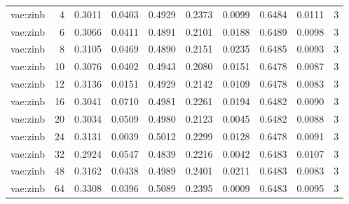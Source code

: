 \begin{tabular}{lrrrrrrrrr}
vae:zinb & 4 & 0.3011 & 0.0403 & 0.4929 & 0.2373 & 0.0099 & 0.6484 & 0.0111 & 3 \\
vae:zinb & 6 & 0.3066 & 0.0411 & 0.4891 & 0.2101 & 0.0188 & 0.6489 & 0.0098 & 3 \\
vae:zinb & 8 & 0.3105 & 0.0469 & 0.4890 & 0.2151 & 0.0235 & 0.6485 & 0.0093 & 3 \\
vae:zinb & 10 & 0.3076 & 0.0402 & 0.4943 & 0.2080 & 0.0151 & 0.6478 & 0.0087 & 3 \\
vae:zinb & 12 & 0.3136 & 0.0151 & 0.4929 & 0.2142 & 0.0109 & 0.6478 & 0.0083 & 3 \\
vae:zinb & 16 & 0.3041 & 0.0710 & 0.4981 & 0.2261 & 0.0194 & 0.6482 & 0.0090 & 3 \\
vae:zinb & 20 & 0.3034 & 0.0509 & 0.4980 & 0.2123 & 0.0045 & 0.6482 & 0.0088 & 3 \\
vae:zinb & 24 & 0.3131 & 0.0039 & 0.5012 & 0.2299 & 0.0128 & 0.6478 & 0.0091 & 3 \\
vae:zinb & 32 & 0.2924 & 0.0547 & 0.4839 & 0.2216 & 0.0042 & 0.6483 & 0.0107 & 3 \\
vae:zinb & 48 & 0.3162 & 0.0438 & 0.4989 & 0.2401 & 0.0211 & 0.6483 & 0.0083 & 3 \\
vae:zinb & 64 & 0.3308 & 0.0396 & 0.5089 & 0.2395 & 0.0009 & 0.6483 & 0.0095 & 3 \\
\bottomrule
\end{tabular}
